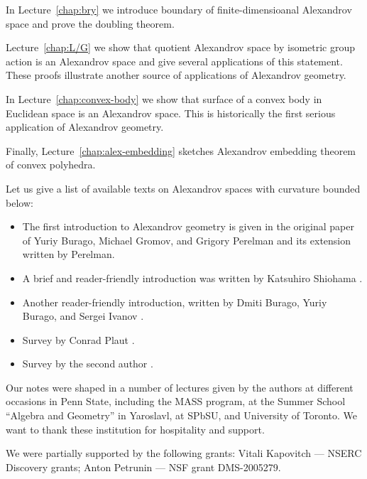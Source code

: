 In Lecture~\ref{chap:bry} we introduce boundary of finite-dimensioanal Alexandrov space and prove the doubling theorem.

Lecture~\ref{chap:L/G} we show that quotient Alexandrov space by isometric group action is an Alexandrov space and give several applications of this statement.
These proofs illustrate another source of applications of Alexandrov geometry.

In Lecture~\ref{chap:convex-body} we show that surface of a convex body in Euclidean space is an Alexandrov space. This is historically the first serious application of Alexandrov geometry.

Finally, Lecture~\ref{chap:alex-embedding} sketches Alexandrov embedding theorem of convex polyhedra.

Let us give a list of available texts on Alexandrov spaces with curvature bounded below: 
\begin{itemize}
\item The first introduction to Alexandrov geometry is given in the original paper of Yuriy Burago, Michael Gromov, and Grigory Perelman \cite{burago-gromov-perelman} 
and its extension \cite{perelman1991} written by Perelman.
\item A brief and reader-friendly introduction was written by Katsuhiro Shiohama \cite[Sections 1--8]{shiohama}.
\item Another reader-friendly introduction, written by Dmiti Burago, Yuriy
Burago, and Sergei Ivanov \cite[Chapter 10]{burago-burago-ivanov}.
\item Survey by Conrad Plaut \cite{plaut:survey}.
\item Survey by the second author \cite{petrunin:survey}.
\end{itemize}

Our notes were shaped in a number of lectures given by the authors
at different occasions in Penn State, including the MASS program,
at the Summer School ``Algebra and Geometry'' in Yaroslavl,
at SPbSU,
and University of Toronto.
We want to thank these institution for hospitality and support.

We were partially supported by the following grants:
Vitali Kapovitch ---   NSERC Discovery grants;
Anton Petrunin --- 
NSF grant DMS-2005279. %


